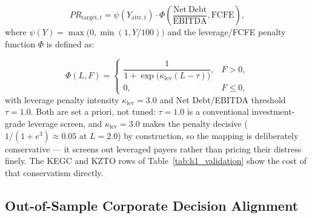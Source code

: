 \documentclass[pdflatex,sn-mathphys-num]{sn-jnl}
\theoremstyle{thmstyleone}
\theoremstyle{thmstyletwo}
\theoremstyle{thmstylethree}
\begin{document}
\begin{equation}
    PR_{\mathrm{target},t} = \psi(Y_{\mathrm{attr},t}) \cdot \Phi\!\left(\frac{\mathrm{Net\ Debt}}{\mathrm{EBITDA}}, \mathrm{FCFE}\right),
    \label{eq:payout}
\end{equation}
where $\psi(Y) = \max\bigl(0, \min(1, Y/100)\bigr)$ and the leverage/FCFE penalty function $\Phi$ is defined as:

\begin{equation}
    \Phi(L, F) =
    \begin{cases}
        \dfrac{1}{1 + \exp\!\bigl(\kappa_{\mathrm{lev}} (L - \tau)\bigr)}, & F > 0, \\[6pt]
        0, & F \le 0,
    \end{cases}
    \label{eq:phi}
\end{equation}
with leverage penalty intensity $\kappa_{\mathrm{lev}} = 3.0$ and Net Debt/EBITDA threshold $\tau = 1.0$. Both are set a priori, not tuned: $\tau = 1.0$ is a conventional investment-grade leverage screen, and $\kappa_{\mathrm{lev}} = 3.0$ makes the penalty decisive ($1/(1+e^{3}) \approx 0.05$ at $L = 2.0$) by construction, so the mapping is deliberately conservative --- it screens out leveraged payers rather than pricing their distress finely. The KEGC and KZTO rows of Table~\ref{tab:h1_validation} show the cost of that conservatism directly.

\subsection{Out-of-Sample Corporate Decision Alignment}\label{subsec4_2}
\end{document}
